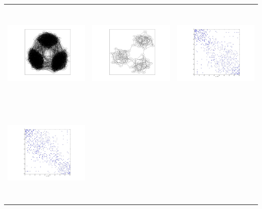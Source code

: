 \begin{tabular}{ |c|c|c| }
\includegraphics[width=5.0cm,height=5.0cm]{images/RandomGraph_With3Cuts_.jpg}                                               &
\includegraphics[width=5.0cm,height=5.0cm]{images/RandomGraph_With3Cuts_90_nodes_pii_25_pij_06.jpg}                          &
\includegraphics[width=5.0cm,height=5.0cm]{images/RandomGraph_With3Cuts_90_nodes_pii_25_pij_06_Adjacency_Matrix.jpg}          \\
\includegraphics[width=5.0cm,height=5.0cm]{images/RandomGraph_With3Cuts_90_nodes_pii_25_pij_06_Adjacency_Matrix_Minimized_PF.jpg}  &

\end{tabular}
